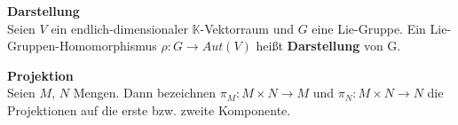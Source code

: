 \documentclass{llncs}
\theoremstyle{plain}
\numberwithin{thm}{section}
\theoremstyle{definition}
\newcommand{\thmbox}[3]{
  \begin{#1}
    \textbf{#2}\\
    #3
  \end{#1}
}
\newcommand{\K}{\mathbb{K}}
\begin{document}
\thmbox{defn}{Darstellung}{Seien $V$ ein endlich-dimensionaler $\K$-Vektorraum und $G$ eine Lie-Gruppe. Ein Lie-Gruppen-Homomorphismus $\rho \colon G \to Aut(V)$ heißt \textbf{Darstellung} von G.}

\thmbox{srbw}{Projektion}{Seien $M$, $N$ Mengen. Dann bezeichnen $\pi_M \colon M \times N \to M$ und $\pi_N \colon M \times N \to N$ die Projektionen auf die erste bzw. zweite Komponente.}

\clearpage







\printbibliography
\end{document}
